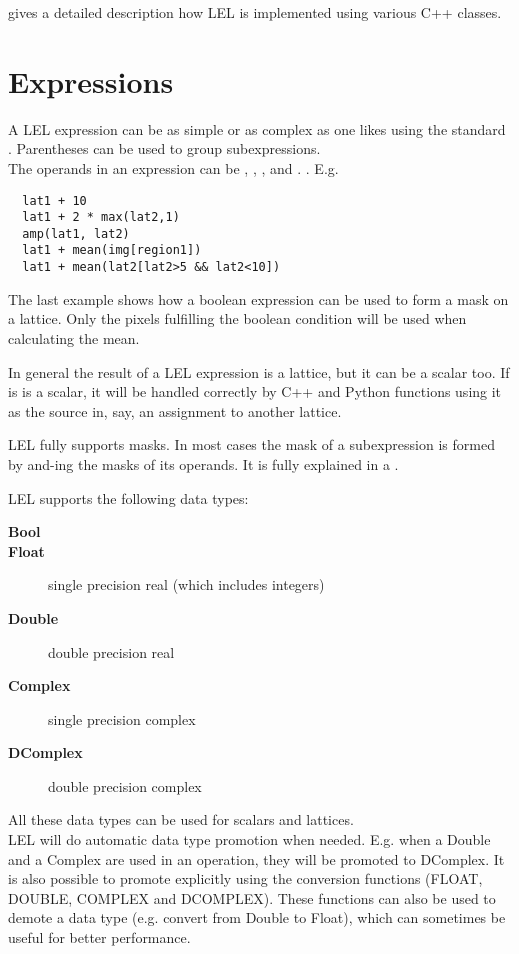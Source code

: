 \medskip\noindent {} gives a
detailed description how LEL is implemented using various C++ classes. 


\section{\label{LEL:EXPRESSIONS}Expressions}

A LEL expression can be as simple or as complex as one likes
using the standard
.
Parentheses can be used to group subexpressions.
\\The operands in an expression can be
,
,
, and
.
.
E.g.
\begin{verbatim}
  lat1 + 10
  lat1 + 2 * max(lat2,1)
  amp(lat1, lat2)
  lat1 + mean(img[region1])
  lat1 + mean(lat2[lat2>5 && lat2<10])
\end{verbatim}

The last example shows how a boolean expression can be used to form a
mask on a lattice.  Only the pixels fulfilling the boolean condition
will be used when calculating the mean. 

\medskip\noindent In general the result of a LEL expression is a lattice,
but it can be a scalar too. If is is a scalar, it will be handled correctly
by C++ and Python functions using it as the source in, say, an
assignment to another lattice.

\medskip\noindent LEL fully supports masks. In most cases the mask of a
subexpression is formed by and-ing the masks of its operands.
It is fully explained in a .


\label{LEL:DATATYPES}
LEL supports the following data types:
\begin{description}
  \item[ \textbf{Bool}]
  \item[ \textbf{Float}] single precision real (which includes integers)
  \item[ \textbf{Double}] double precision real
  \item[ \textbf{Complex} ] single precision complex
  \item[ \textbf{DComplex} ] double precision complex
\end{description}
All these data types can be used for scalars and lattices.
\\LEL will do automatic data type promotion when needed. E.g. when
a Double and a Complex are used in an operation, they will be promoted
to DComplex. It is also possible to promote explicitly using the
conversion functions (FLOAT, DOUBLE, COMPLEX and DCOMPLEX).
These functions can also be used to demote a data type
(e.g. convert from Double to Float), which can sometimes
be useful for better performance.

